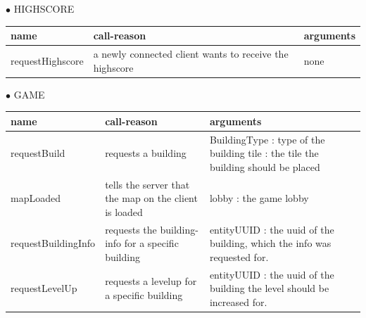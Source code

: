 \documentclass{scrartcl}
\newcommand{\n}{\newline}
\begin{document}
$\bullet$ HIGHSCORE
\begin{center}
    \begin{tabular}{| p{3.1cm} | p{5cm} | p{5.9cm} |}
        \hline
        \textbf{name} & \textbf{call-reason} & \textbf{arguments} \\ \hline
        requestHighscore & a newly connected client wants to receive the highscore & none \\ \hline
    \end{tabular}
\end{center}
\newpage
$\bullet$ GAME
\begin{center}
    \begin{tabular}{| p{3.1cm} | p{5cm} | p{5.9cm} |}
        \hline
        \textbf{name} & \textbf{call-reason} & \textbf{arguments} \\ \hline
        requestBuild & requests a building & BuildingType : type of the building\n
        tile : the tile the building should be placed \\ \hline
        mapLoaded & tells the server that the map on the client is loaded & lobby : the game lobby \\ \hline
        requestBuildingInfo & requests the building-info for a specific building & entityUUID : the uuid of the building, which the info was requested for.\\ \hline
        requestLevelUp & requests a levelup for a specific building & entityUUID : the uuid of the building the level should be increased for.\\ \hline
    \end{tabular}
\end{center}

\pagebreak
\end{document}
